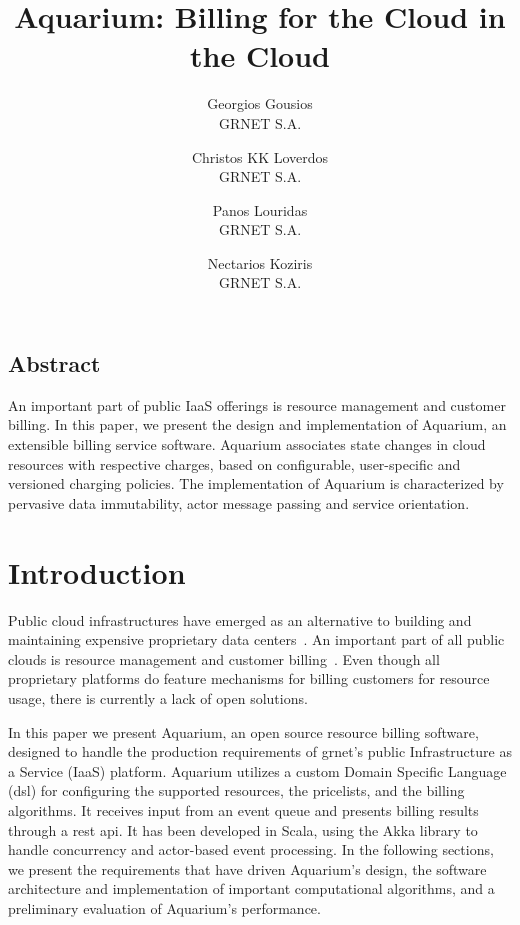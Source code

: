 \documentclass[letterpaper,twocolumn,10pt]{article}
\newcommand{\grnet}{{\sc grnet}\xspace}
\begin{document}
\date{}

\title{Aquarium: Billing for the Cloud in the Cloud}

\author{
{\rm Georgios Gousios}\\
GRNET S.A.
\and
{\rm Christos KK Loverdos}\\
GRNET S.A.
\and
{\rm Panos Louridas}\\
GRNET S.A.
\and
{\rm Nectarios Koziris}\\
GRNET S.A.
} %

\maketitle


\thispagestyle{empty}

\subsection*{Abstract}

An important part of public IaaS offerings is resource management and
customer billing. In this paper, we present the design and
implementation of Aquarium, an extensible billing service software.
Aquarium associates state changes in cloud resources with respective
charges, based on configurable, user-specific and versioned charging
policies. The implementation of Aquarium is characterized by pervasive
data immutability, actor message passing and service orientation.

\section{Introduction}

Public cloud infrastructures have emerged as an alternative to
building and maintaining expensive proprietary data
centers~\cite{Lourid10}. An important part of all public clouds is
resource management and customer billing~\cite{Armbr10}.
Even though all proprietary platforms do feature
mechanisms for billing customers for resource usage, there is
currently a lack of open solutions.

In this paper we present Aquarium, an open source resource billing software,
designed to handle the production  requirements of \grnet's public
Infrastructure as a Service (IaaS) platform. Aquarium utilizes a custom Domain
Specific Language ({\sc dsl}) for configuring the supported resources, the
pricelists, and the billing algorithms. It receives input from an event queue
and presents billing results through a {\sc rest api}. It has been developed
in Scala, using the Akka library to handle concurrency and actor-based
event processing. In the following sections, we present the requirements
that have driven Aquarium's design, the software architecture and
implementation of important computational algorithms, and a preliminary
evaluation of Aquarium's performance. 
\end{document}
